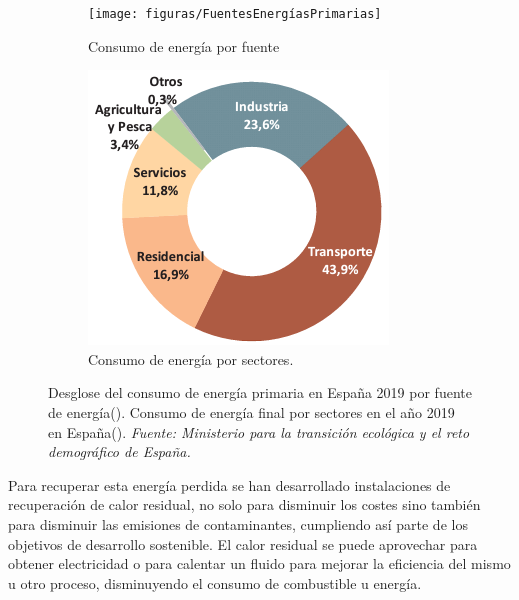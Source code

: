 \begin{figure}[H]
	\centering
	\begin{subfigure}[b]{0.48\textwidth}
		\texttt{[image: figuras/FuentesEnergíasPrimarias]}
		\caption{Consumo de energía por fuente}
		\label{fig:fuentesenergiasprimarias}
	\end{subfigure}
	\hfill
	\begin{subfigure}[b]{0.48\textwidth}
		\centering
		\includegraphics[width=\textwidth]{figuras/consumoEnergiaFinalPorSectores_2019}
		\caption{Consumo de energía por sectores.}
		\label{fig:consumoenergiafinalporsectores2019}
	\end{subfigure}
\caption[Desglose del consumo de energía primaria en España 20]{Desglose del consumo de energía primaria en España 2019 por fuente de energía(). Consumo de energía final por sectores en el año 2019 en España(). \textit{Fuente:  Ministerio para la transición ecológica y el reto demográfico de España.} }
 \label{fig:consumosEnergiasCategorias}
\end{figure}

Para recuperar esta energía perdida se han desarrollado instalaciones de recuperación de calor residual, no solo para disminuir los costes sino también para disminuir las emisiones de contaminantes, cumpliendo así parte de los objetivos de desarrollo sostenible. El calor residual se puede aprovechar para obtener electricidad o para calentar un fluido para mejorar la eficiencia del mismo u otro proceso, disminuyendo el consumo de combustible u energía.\\

